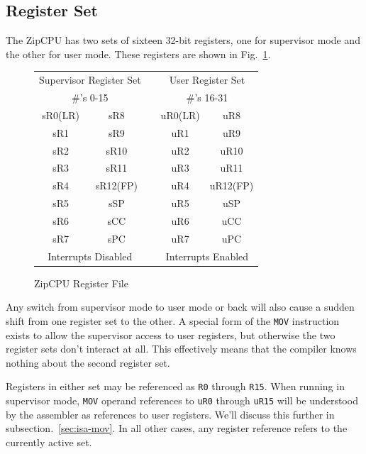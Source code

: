 \documentclass{gqtekspec}
\begin{document}
\subsection{Register Set}
The ZipCPU has two sets of sixteen 32-bit registers, one for supervisor mode
and the other for user mode.  These registers are shown in
Fig.~\ref{fig:regset}.
\begin{figure}\begin{center}
\begin{tabular}{|c|c|c|c|c|}
\multicolumn{2}{c}{Supervisor Register Set} &
	\multicolumn{1}{c}{} &
	\multicolumn{2}{c}{User Register Set} \\
\multicolumn{2}{c}{\#'s 0-15} & \multicolumn{1}{c}{} &
	\multicolumn{2}{c}{\#'s 16-31} \\\hline\hline
sR0(LR)	& sR8	&& uR0(LR) &	uR8	\\\cline{1-2}\cline{4-5}
sR1	& sR9	&& uR1	&	uR9	\\\cline{1-2}\cline{4-5}
sR2	& sR10	&& uR2	&	uR10	\\\cline{1-2}\cline{4-5}
sR3	& sR11	&& uR3	&	uR11	\\\cline{1-2}\cline{4-5}
sR4	& sR12(FP)&& uR4&	uR12(FP)\\\cline{1-2}\cline{4-5}
sR5	& sSP	&& uR5	&	uSP	\\\cline{1-2}\cline{4-5}
sR6	& sCC	&& uR6	&	uCC	\\\cline{1-2}\cline{4-5}
sR7	& sPC	&& uR7	&	uPC	\\\hline\hline
\multicolumn{2}{c}{Interrupts Disabled} &
	\multicolumn{1}{c}{} &
	\multicolumn{2}{c}{Interrupts Enabled} \\
\end{tabular}
\caption{ZipCPU Register File}\label{fig:regset}
\end{center}\end{figure}
Any switch from supervisor mode to user mode or back will also cause a sudden
shift from one register set to the other.  A special form of the {\tt MOV}
instruction exists to allow the supervisor access to user registers, but
otherwise the two register sets don't interact at all.  This effectively
means that the compiler knows nothing about the second register set.

Registers in either set may be referenced as {\tt R0} through {\tt R15}.
When running in supervisor mode, {\tt MOV} operand references to {\tt uR0}
through {\tt uR15} will be understood by the assembler as references to
user registers.  We'll discuss this further in subsection.~\ref{sec:isa-mov}.
In all other cases, any register reference refers to the currently active set.
\end{document}
